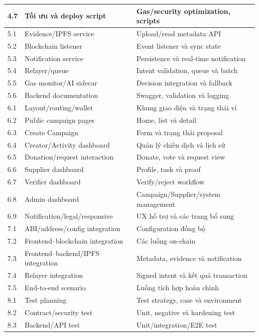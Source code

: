 \begin{longtable}{| p{1.2cm} | p{4.9cm} | p{6.7cm} |}
4.7 & Tối ưu và deploy script & Gas/security optimization, scripts \\
\hline
5.1 & Evidence/IPFS service & Upload/read metadata API \\ \hline
5.2 & Blockchain listener & Event listener và sync state \\ \hline
5.3 & Notification service & Persistence và real-time notification \\ \hline
5.4 & Relayer/queue & Intent validation, queue và batch \\ \hline
5.5 & Gas monitor/AI sidecar & Decision integration và fallback \\ \hline
5.6 & Backend documentation & Swagger, validation và logging \\
\hline
6.1 & Layout/routing/wallet & Khung giao diện và trạng thái ví \\ \hline
6.2 & Public campaign pages & Home, list và detail \\ \hline
6.3 & Create Campaign & Form và trạng thái proposal \\ \hline
6.4 & Creator/Activity dashboard & Quản lý chiến dịch và lịch sử \\ \hline
6.5 & Donation/request interaction & Donate, vote và request view \\ \hline
6.6 & Supplier dashboard & Profile, task và proof \\ \hline
6.7 & Verifier dashboard & Verify/reject workflow \\ \hline
6.8 & Admin dashboard & Campaign/Supplier/system management \\ \hline
6.9 & Notification/legal/responsive & UX hỗ trợ và các trang bổ sung \\
\hline
7.1 & ABI/address/config integration & Configuration đồng bộ \\ \hline
7.2 & Frontend--blockchain integration & Các luồng on-chain \\ \hline
7.3 & Frontend--backend/IPFS integration & Metadata, evidence và notification \\ \hline
7.4 & Relayer integration & Signed intent và kết quả transaction \\ \hline
7.5 & End-to-end scenario & Luồng tích hợp hoàn chỉnh \\
\hline
8.1 & Test planning & Test strategy, case và environment \\ \hline
8.2 & Contract/security test & Unit, negative và hardening test \\ \hline
8.3 & Backend/API test & Unit/integration/E2E test \\ \hline

\end{longtable}
